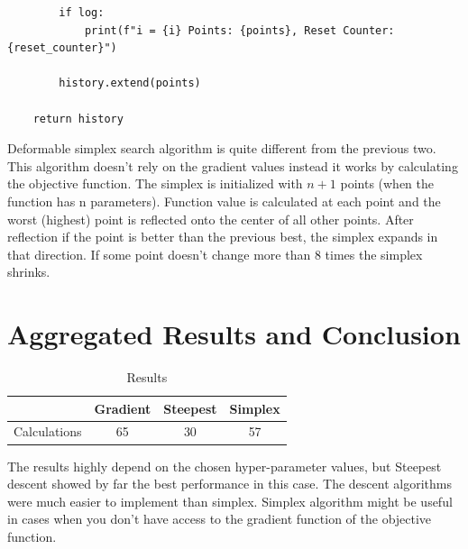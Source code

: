 \documentclass{article}
\begin{document}
\begin{verbatim}
        if log:
            print(f"i = {i} Points: {points}, Reset Counter: {reset_counter}")
        
        history.extend(points)
    
    return history
        \end{verbatim}
        Deformable simplex search algorithm is quite different from the previous two. This algorithm doesn't rely on the gradient values instead it works by calculating the objective function. The simplex is initialized with $n+1$ points (when the function has n parameters). Function value is calculated at each point and the worst (highest) point is reflected onto the center of all other points. After reflection if the point is better than the previous best, the simplex expands in that direction. If some point doesn't change more than 8 times the simplex shrinks.
    \section*{Aggregated Results and Conclusion}
        \begin{table}[h!]
            \centering
            \begin{tabular}{|c|c|c|c|}
                \hline
                 & Gradient & Steepest & Simplex \\ \hline
                Calculations & 65 & 30 & 57 \\ \hline
            \end{tabular}
            \caption{Results}
        \end{table}
        The results highly depend on the chosen hyper-parameter values, but Steepest descent showed by far the best performance in this case. The descent algorithms were much easier to implement than simplex. Simplex algorithm might be useful in cases when you don't have access to the gradient function of the objective function.

    
\end{document}
